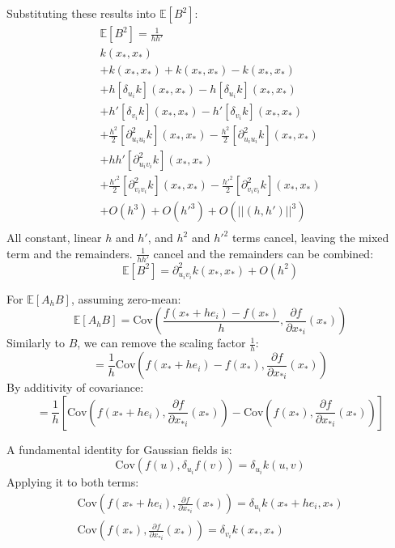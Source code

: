 Substituting these results into $\mathbb{E}[B^2]$:
\begin{equation*}
    \begin{aligned}
        \mathbb{E}[B^2] = \frac{1}{hh'} \\
        k(x_*,x_*) \\
        + k(x_*,x_*) + k(x_*,x_*) - k(x_*,x_*) \\
        + h [\delta_{u_i}k](x_*, x_*) - h [\delta_{u_i}k](x_*, x_*) \\
        + h' [\delta_{v_i}k](x_*, x_*) - h' [\delta_{v_i}k](x_*, x_*) \\
        + \frac{h^2}{2} [\partial_{u_i u_i}^2k](x_*, x_*) -  \frac{h^2}{2} [\partial_{u_i u_i}^2k](x_*, x_*) \\
        + hh' [\partial_{u_i v_i}^2k](x_*, x_*) \\
        + \frac{h'^2}{2} [\partial_{v_i v_i}^2k](x_*, x_*) - \frac{h'^2}{2} [\partial_{v_i v_i}^2k](x_*, x_*) \\
        + O(h^3) + O(h'^3) + O(||(h,h')||^3) \\
    \end{aligned}
\end{equation*}
All constant, linear $h$ and $h'$, and $h^2$ and $h'^2$ terms cancel, leaving the mixed term and the remainders. $\frac{1}{hh'}$ cancel and the remainders can be combined:
\begin{equation} \label{eq:msd_b_final}
    \mathbb{E}[B^2] = \partial_{u_i v_i}^2 k(x_*, x_*) + O(h^2)
\end{equation}

For $\mathbb{E}[A_h B]$, assuming zero-mean:
\begin{equation*}
    \mathbb{E}[A_h B] = \text{Cov} \left( \frac{f(x_* + h e_i) - f(x_*)}{h}, \frac{\partial f}{\partial x_{*i}}(x_*) \right)
\end{equation*}
Similarly to $B$, we can remove the scaling factor $\frac{1}{h}$:
\begin{equation*}
    = \frac{1}{h} \text{Cov} \left( f(x_* + h e_i) - f(x_*), \frac{\partial f}{\partial x_{*i}}(x_*) \right)
\end{equation*}
By additivity of covariance:
\begin{equation*}
    = \frac{1}{h} \left[ \text{Cov} (f(x_* + h e_i), \frac{\partial f}{\partial x_{*i}}(x_*) ) - \text{Cov} (f(x_*), \frac{\partial f}{\partial x_{*i}}(x_*)) \right]
\end{equation*}

A fundamental identity for Gaussian fields \cite{gp-ml} is:
\begin{equation*}
    \text{Cov}(f(u), \delta_{u_i} f(v)) = \delta_{u_i} k(u, v)
\end{equation*}
Applying it to both terms:
\begin{equation*}
    \begin{aligned}
        \text{Cov}(f(x_* + h e_i), \frac{\partial f}{\partial x_{*i}}(x_*)) = \delta_{u_i} k(x_* + h e_i, x_*) \\
        \text{Cov}(f(x_*), \frac{\partial f}{\partial x_{*i}}(x_*)) = \delta_{v_i} k(x_*, x_*) \\
    \end{aligned}
\end{equation*}

